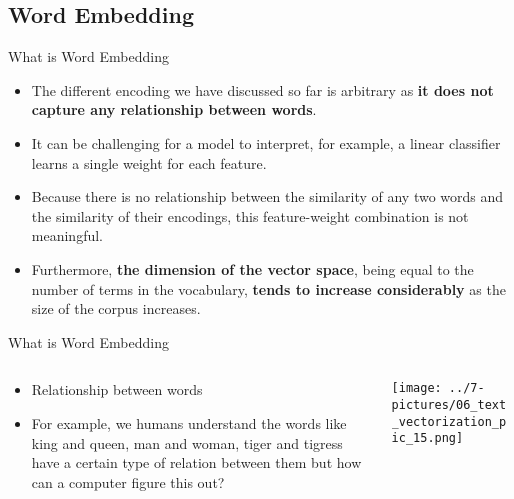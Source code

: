 \documentclass[11pt]{beamer}
\begin{document}
\subsection{Word Embedding \\ \scalebox{0.8}{}}
\begin{frame}{What is Word Embedding}
	\begin{itemize}
		\item The different encoding we have discussed so far is arbitrary as \textbf{it does not capture any relationship between words}. 
		\item It can be challenging for a model to interpret, for example, a linear classifier learns a single weight for each feature. 
		\item Because there is no relationship between the similarity of any two words and the similarity of their encodings, this feature-weight combination is not meaningful.
		\item Furthermore, \textbf{the dimension of the vector space}, being equal to the number of terms in the vocabulary, \textbf{tends to increase considerably} as the size of the corpus increases.
	\end{itemize}
\end{frame}
\begin{frame}{What is Word Embedding}
\begin{columns}[T] %
\begin{column}{.48\textwidth}
        \begin{itemize}
        \item Relationship between words
		\item For example, we humans understand the words like king and queen, man and woman, tiger and tigress have a certain type of relation between them but how can a computer figure this out?
        \end{itemize}
\end{column}%
\hfill%
\begin{column}{.48\textwidth}
        \texttt{[image: ../7-pictures/06\_text\_vectorization\_pic\_15.png]}
\end{column}%
\end{columns}
\end{frame}
\end{document}
